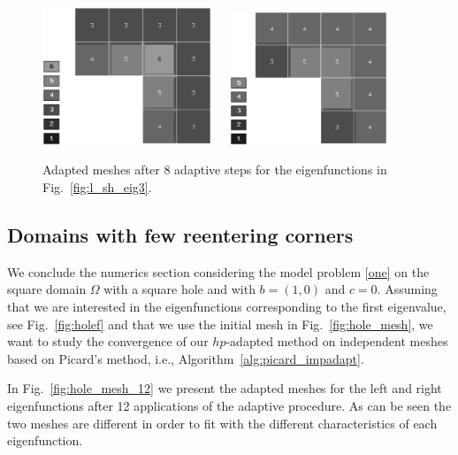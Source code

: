 \documentclass[smallextended]{svjour3}
\begin{document}
\begin{figure}[!ht]
\begin{center}
\includegraphics[width=0.45\textwidth]{lshape7.eps}\ \ \ 
\includegraphics[width=0.42\textwidth]{lshape8.eps}
\end{center}
\caption{Adapted meshes after 8 adaptive steps for the eigenfunctions in Fig.~\ref{fig:l_sh_eig3}.}
\label{fig:l_sh_eig4}
\end{figure}

\subsection{Domains with few reentering corners}\label{ssec:reent}

We conclude the numerics section considering the model problem \eqref{one} on the square domain $\Omega$ with a square hole and with $b=(1,0)$ and $c=0$. Assuming that we are interested in the eigenfunctions corresponding to the first eigenvalue, see Fig.~\ref{fig:holef} and that we use the initial mesh in Fig.~\ref{fig:hole_mesh}, we want to study the convergence of our $hp$-adapted method on independent meshes based on Picard's method, i.e., Algorithm~\ref{alg:picard_impadapt}.

In Fig.~\ref{fig:hole_mesh_12} we present the adapted meshes for the left and right eigenfunctions after 12 applications of the adaptive procedure. As can be seen the two meshes are different in order to fit with the different characteristics of each eigenfunction.
\end{document}
